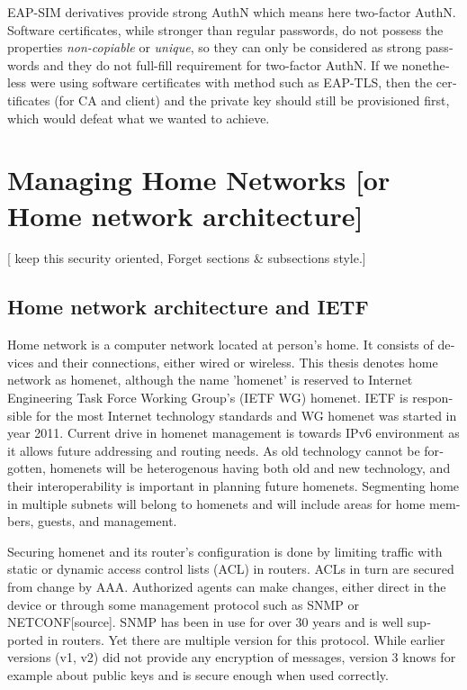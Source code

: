 \documentclass[12pt,a4paper,english]{tutthesis}
\begin{document}
\begin{otherlanguage}{english}
EAP-SIM derivatives provide strong AuthN which means here two-factor
AuthN. Software certificates, while stronger than regular passwords,
do not possess the properties \emph{non-copiable} or \emph{unique}, so they can only
be considered as strong passwords and they do not full-fill 
requirement for two-factor AuthN.
If we nonetheless were using software certificates with method such as
EAP-TLS, then the certificates (for CA and client) and the private key
should still be provisioned first, which would defeat what we wanted
to achieve.



\chapter{Managing Home Networks [or Home network architecture]}
\label{sec-3}
[ keep this security oriented, Forget sections \& subsections style.]

\section{Home network architecture and IETF}
\label{sec-3-1}


Home network is a computer network located at person's home. It consists
of devices and their connections, either wired or wireless.  This
thesis denotes home network as homenet, although the name 'homenet'
is reserved to Internet Engineering Task Force Working Group's (IETF
WG) homenet.
IETF is responsible for the most Internet technology standards and 
WG homenet was started in year 2011.
Current drive in homenet management is towards IPv6 environment
 as it allows future  addressing and routing needs. As old technology
cannot be forgotten, homenets will be heterogenous having both
old and new technology, and their interoperability is important in
planning future homenets. Segmenting home in multiple subnets will belong
to homenets and will include areas for home members, guests,
and management.



Securing homenet and its router's configuration is done by limiting
traffic with static or dynamic access control lists (ACL) in
routers. ACLs in turn are secured from change by AAA. Authorized
agents can make changes, either direct in the device or through some
management protocol such as SNMP or NETCONF[source].  SNMP has been in
use for over 30 years and is well supported in routers. Yet there are
multiple version for this protocol. While earlier versions (v1, v2)
did not provide any encryption of messages, version 3 knows for example
about public keys and is secure enough when used correctly.



\end{otherlanguage}
\end{document}
